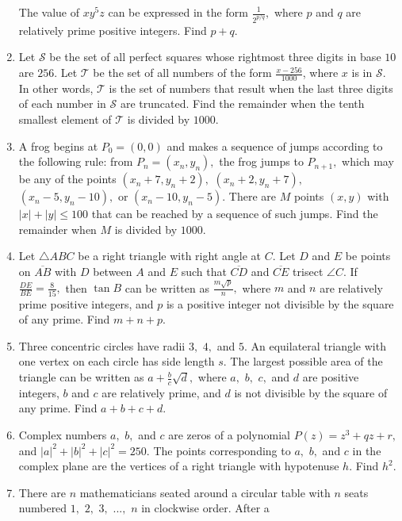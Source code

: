 \documentclass{article}
\begin{document}
\begin{enumerate}[label=\arabic*., itemsep=0.5em]
The value of \(xy^5z\) can be expressed in the form \(\frac{1}{2^{p/q}},\) where \(p\) and \(q\) are relatively prime positive integers. Find \(p+q.\)\par \vspace{0.5em}\item Let \(\mathcal{S}\) be the set of all perfect squares whose rightmost three digits in base \(10\) are \(256\). Let \(\mathcal{T}\) be the set of all numbers of the form \(\frac{x-256}{1000}\), where \(x\) is in \(\mathcal{S}\). In other words, \(\mathcal{T}\) is the set of numbers that result when the last three digits of each number in \(\mathcal{S}\) are truncated. Find the remainder when the tenth smallest element of \(\mathcal{T}\) is divided by \(1000\).\par \vspace{0.5em}\item A frog begins at \(P_0 = (0,0)\) and makes a sequence of jumps according to the following rule: from \(P_n = (x_n, y_n),\) the frog jumps to \(P_{n+1},\) which may be any of the points \((x_n + 7, y_n + 2),\) \((x_n + 2, y_n + 7),\) \((x_n - 5, y_n - 10),\) or \((x_n - 10, y_n - 5).\) There are \(M\) points \((x, y)\) with \(|x| + |y| \le 100\) that can be reached by a sequence of such jumps. Find the remainder when \(M\) is divided by \(1000.\)\par \vspace{0.5em}\item Let \(\triangle ABC\) be a right triangle with right angle at \(C.\) Let \(D\) and \(E\) be points on \(\overline{AB}\) with \(D\) between \(A\) and \(E\) such that \(\overline{CD}\) and \(\overline{CE}\) trisect \(\angle C.\) If \(\frac{DE}{BE} = \frac{8}{15},\) then \(\tan B\) can be written as \(\frac{m \sqrt{p}}{n},\) where \(m\) and \(n\) are relatively prime positive integers, and \(p\) is a positive integer not divisible by the square of any prime. Find \(m+n+p.\)\par \vspace{0.5em}\item Three concentric circles have radii \(3,\) \(4,\) and \(5.\) An equilateral triangle with one vertex on each circle has side length \(s.\) The largest possible area of the triangle can be written as \(a + \tfrac{b}{c} \sqrt{d},\) where \(a,\) \(b,\) \(c,\) and \(d\) are positive integers, \(b\) and \(c\) are relatively prime, and \(d\) is not divisible by the square of any prime. Find \(a+b+c+d.\)\par \vspace{0.5em}\item Complex numbers \(a,\) \(b,\) and \(c\) are zeros of a polynomial \(P(z) = z^3 + qz + r,\) and \(|a|^2 + |b|^2 + |c|^2 = 250.\) The points corresponding to \(a,\) \(b,\) and \(c\) in the complex plane are the vertices of a right triangle with hypotenuse \(h.\) Find \(h^2.\)\par \vspace{0.5em}\item There are \(n\) mathematicians seated around a circular table with \(n\) seats numbered \(1,\) \(2,\) \(3,\) \(...,\) \(n\) in clockwise order. After a 
\end{enumerate}
\end{document}
